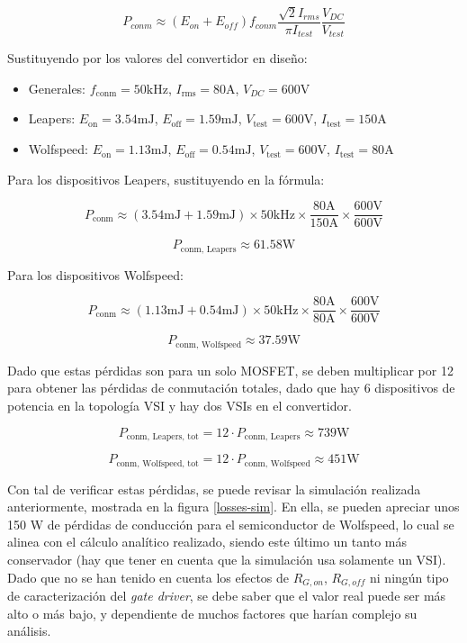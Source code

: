 \[
P_{conm} \approx (E_{on} + E_{off}) f_{conm} \frac{\sqrt{2} I_{rms}}{\pi I_{test}} \frac{V_{DC}}{V_{test}}
\]

Sustituyendo por los valores del convertidor en diseño:

\begin{itemize}
	\item Generales: \(f_{\text{conm}} = 50 \text{kHz}\), \(I_{\text{rms}} = 80 \text{A}\), \(V_{DC} = 600 \text{V}\)
	\item Leapers: \(E_{\text{on}} = 3.54 \text{mJ}\), \(E_{\text{off}} = 1.59 \text{mJ}\), \(V_{\text{test}} = 600 \text{V}\), \(I_{\text{test}} = 150 \text{A}\)
	\item Wolfspeed: \(E_{\text{on}} = 1.13 \text{mJ}\), \(E_{\text{off}} = 0.54 \text{mJ}\), \(V_{\text{test}} = 600 \text{V}\), \(I_{\text{test}} = 80 \text{A}\)
\end{itemize}

Para los dispositivos Leapers, sustituyendo en la fórmula:

\[
P_{\text{conm}} \approx (3.54 \text{mJ} + 1.59 \text{mJ}) \times 50 \text{kHz} \times \frac{80 \text{A}}{150 \text{A}} \times \frac{600 \text{V}}{600 \text{V}}
\]

\[
P_{\text{conm, Leapers}} \approx 61.58 \text{W}
\]

Para los dispositivos Wolfspeed:

\[
P_{\text{conm}} \approx (1.13 \text{mJ} + 0.54 \text{mJ}) \times 50 \text{kHz} \times \frac{80  \text{A}}{80 \text{A}} \times \frac{600 \text{V}}{600 \text{V}}
\]

\[
P_{\text{conm, Wolfspeed}} \approx 37.59 \text{W}
\]

Dado que estas pérdidas son para un solo MOSFET, se deben multiplicar por 12 para obtener las pérdidas de conmutación totales, dado que hay 6 dispositivos de potencia en la topología VSI y hay dos VSIs en el convertidor.

\[
P_{\text{conm, Leapers, tot}} = 12\cdot P_{\text{conm, Leapers}} \approx 739 \text{W}
\]

\[
P_{\text{conm, Wolfspeed, tot}} = 12\cdot P_{\text{conm, Wolfspeed}} \approx 451 \text{W}
\]

Con tal de verificar estas pérdidas, se puede revisar la simulación realizada anteriormente, mostrada en la figura \ref{losses-sim}. En ella, se pueden apreciar unos 150 W de pérdidas de conducción para el semiconductor de Wolfspeed, lo cual se alinea con el cálculo analítico realizado, siendo este último un tanto más conservador (hay que tener en cuenta que la simulación usa solamente un VSI). Dado que no se han tenido en cuenta los efectos de $R_{G, on}$, $R_{G, off}$ ni ningún tipo de caracterización del \textit{gate driver}, se debe saber que el valor real puede ser más alto o más bajo, y dependiente de muchos factores que harían complejo su análisis.



